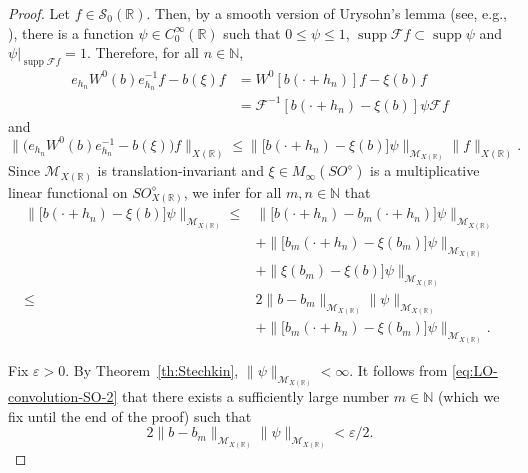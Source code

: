 \documentclass{birkjour}
\numberwithin{equation}{section}
\newcommand{\N}{\mathbb{N}}
\newcommand{\R}{\mathbb{R}}
\newcommand{\cF}{\mathcal{F}}
\newcommand{\cM}{\mathcal{M}}
\newcommand{\cS}{\mathcal{S}}
\newcommand{\eps}{\varepsilon}
\begin{document}
\begin{proof}
Let $f\in\cS_0(\R)$. Then, by a smooth version of Urysohn's lemma
(see, e.g., \cite[Proposition~6.5]{F09}), there is a function
$\psi\in C_0^\infty(\R)$ such that $0\le\psi\le 1$,
$\operatorname{supp}\cF f\subset\operatorname{supp}\psi$
and $\psi|_{\operatorname{supp}\cF f}=1$. Therefore, for all $n\in\N$,
\begin{align*}
e_{h_n}W^0(b)e_{h_n}^{-1}f-b(\xi)f
&=
W^0[b(\cdot+h_n)]f-\xi(b)f
\\
&=
\cF^{-1}[b(\cdot+h_n)-\xi(b)]\psi\cF f
\end{align*}
and
\begin{equation}\label{eq:LO-convolution-SO-6}
\big\|\big(e_{h_n}W^0(b)e_{h_n}^{-1}-b(\xi)\big)f\big\|_{{X(\R)}}
\le
\big\|\big[b(\cdot+h_n)-\xi(b)\big]\psi\|_{\cM_{X(\R)}}\|f\|_{X(\R)}.
\end{equation}
Since $\cM_{X(\R)}$ is translation-invariant and $\xi\in M_\infty(SO^\diamond)$
is a multiplicative linear functional on $SO_{X(\R)}^\diamond$, we infer for
all $m,n\in\N$ that
\begin{align}
\big\|\big[b(\cdot+h_n)-\xi(b)\big]\psi\|_{\cM_{X(\R)}}
\le&
\big\|\big[b(\cdot+h_n)-b_m(\cdot+h_n)\big]\psi\|_{\cM_{X(\R)}}
\nonumber\\
&+
\big\|\big[b_m(\cdot+h_n)-\xi(b_m)\big]\psi\|_{\cM_{X(\R)}}
\nonumber\\
&+
\big\|\xi(b_m)-\xi(b)\big]\psi\|_{\cM_{X(\R)}}
\nonumber\\
\le &
2\|b-b_m\|_{\cM_{X(\R)}}\|\psi\|_{\cM_{X(\R)}}
\nonumber\\
&+
\big\|\big[b_m(\cdot+h_n)-\xi(b_m)\big]\psi\|_{\cM_{X(\R)}}.
\label{eq:LO-convolution-SO-7}
\end{align}

Fix $\eps>0$.
By Theorem~\ref{th:Stechkin}, $\|\psi\|_{\cM_{X(\R)}}<\infty$.
It follows from \eqref{eq:LO-convolution-SO-2}
that there exists a sufficiently large number $m\in\N$
(which we fix until the end of the proof)
such that
\begin{equation}\label{eq:LO-convolution-SO-8}
2\|b-b_m\|_{\cM_{X(\R)}}\|\psi\|_{\cM_{X(\R)}}<\eps/2.
\end{equation}


\end{proof}
\end{document}
